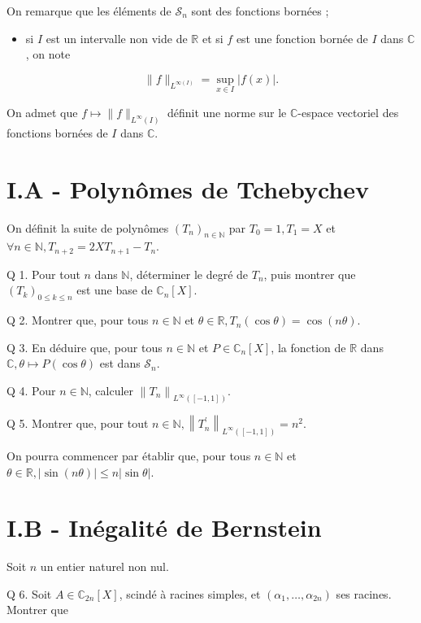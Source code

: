 \documentclass[10pt]{article}
\begin{document}
On remarque que les éléments de $\mathcal{S}_{n}$ sont des fonctions bornées ;

\begin{itemize}
  \item si $I$ est un intervalle non vide de $\mathbb{R}$ et si $f$ est une fonction bornée de $I$ dans $\mathbb{C}$, on note
\end{itemize}

$$
\|f\|_{L^{\infty(I)}}=\sup _{x \in I}|f(x)| .
$$

On admet que $f \mapsto\|f\|_{L^{\infty}(I)}$ définit une norme sur le $\mathbb{C}$-espace vectoriel des fonctions bornées de $I$ dans $\mathbb{C}$.

\section{I.A - Polynômes de Tchebychev}
On définit la suite de polynômes $\left(T_{n}\right)_{n \in \mathbb{N}}$ par $T_{0}=1, T_{1}=X$ et $\forall n \in \mathbb{N}, T_{n+2}=2 X T_{n+1}-T_{n}$.

Q 1. Pour tout $n$ dans $\mathbb{N}$, déterminer le degré de $T_{n}$, puis montrer que $\left(T_{k}\right)_{0 \leqslant k \leqslant n}$ est une base de $\mathbb{C}_{n}[X]$.

Q 2. Montrer que, pour tous $n \in \mathbb{N}$ et $\theta \in \mathbb{R}, T_{n}(\cos \theta)=\cos (n \theta)$.

Q 3. En déduire que, pour tous $n \in \mathbb{N}$ et $P \in \mathbb{C}_{n}[X]$, la fonction de $\mathbb{R}$ dans $\mathbb{C}, \theta \mapsto P(\cos \theta)$ est dans $\mathcal{S}_{n}$.

Q 4. Pour $n \in \mathbb{N}$, calculer $\left\|T_{n}\right\|_{L^{\infty}([-1,1])}$.

Q 5. Montrer que, pour tout $n \in \mathbb{N},\left\|T_{n}^{\prime}\right\|_{L^{\infty}([-1,1])}=n^{2}$.

On pourra commencer par établir que, pour tous $n \in \mathbb{N}$ et $\theta \in \mathbb{R},|\sin (n \theta)| \leqslant n|\sin \theta|$.

\section{I.B - Inégalité de Bernstein}
Soit $n$ un entier naturel non nul.

Q 6. Soit $A \in \mathbb{C}_{2 n}[X]$, scindé à racines simples, et $\left(\alpha_{1}, \ldots, \alpha_{2 n}\right)$ ses racines. Montrer que
\end{document}
